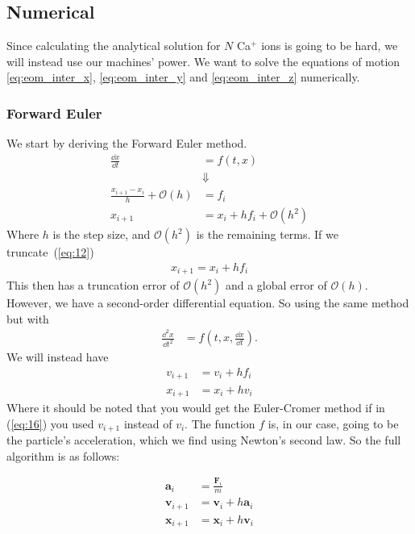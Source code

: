 \subsection{Numerical}
Since calculating the analytical solution for $N$ Ca$^{+}$ ions is going to be hard,
we will instead use our machines' power. We want to solve the equations of motion
\ref{eq:eom_inter_x}, \ref{eq:eom_inter_y} and \ref{eq:eom_inter_z} numerically.

\subsubsection{Forward Euler} \label{sec:forward-euler}
We start by deriving the Forward Euler method.
\begin{align}
  \frac{\dd{x}}{\dd{t}} &= f(t, x)\\
  &\Downarrow\nonumber\\
  \frac{x_{i+1}  - x_{i}}{h} + \mathcal{O}(h) &= f_{i}\\
  x_{i+1} &= x_{i} + hf_{i} + \mathcal{O}(h^{2}) \label{eq:12}
\end{align}
Where $h$ is the step size, and $\mathcal{O}(h^{2})$ is the remaining terms.
If we truncate~(\ref{eq:12})
\begin{align}
  x_{i+1} = x_{i} + hf_{i} \label{eq:13}
\end{align}
This then has a truncation error of $\mathcal{O}(h^{2})$ and a global error of $\mathcal{O}(h)$.
However, we have a second-order differential equation. So using the same method but with
\begin{align}
  \frac{\dd^{2}{x}}{\dd{t^{2}}} &= f\left(t, x, \frac{\dd{x}}{\dd{t}}\right).
\end{align}
We will instead have
\begin{align}
  v_{i+1} &= v_{i} + hf_{i}\label{eq:14}\\
  x_{i+1} &= x_{i} + hv_{i} \label{eq:16}
\end{align}
Where it should be noted that you would get the Euler-Cromer method if in (\ref{eq:16}) you used $v_{i+1}$ instead of $v_{i}$.
The function $f$ is, in our case, going to be the particle's acceleration, which we find using Newton's second law.
So the full algorithm is as follows:

\begin{align}
  \mathbf{a}_{i} &= \frac{\mathbf{F}_{i}}{m}\\
  \mathbf{v}_{i+1} &= \mathbf{v}_{i} + h\mathbf{a}_{i}\\
  \mathbf{x}_{i+1} &= \mathbf{x}_{i} + h\mathbf{v}_{i}\\
\end{align}


